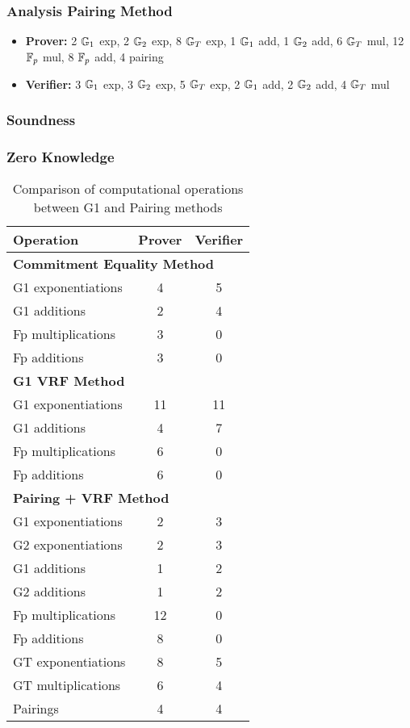 \newpage
\subsubsection{Analysis Pairing Method}
\begin{itemize}
    \item \textbf{Prover:} 2 $\mathbb{G}_1$ exp, 2 $\mathbb{G}_2$ exp, 8 $\mathbb{G}_T$ exp, 1 $\mathbb{G}_1$ add, 1 $\mathbb{G}_2$ add, 6 $\mathbb{G}_T$ mul, 12 $\mathbb{F}_p$ mul, 8 $\mathbb{F}_p$ add, 4 pairing
    
    \item \textbf{Verifier:} 3 $\mathbb{G}_1$ exp, 3 $\mathbb{G}_2$ exp, 5 $\mathbb{G}_T$ exp, 2 $\mathbb{G}_1$ add, 2 $\mathbb{G}_2$ add, 4 $\mathbb{G}_T$ mul
\end{itemize}

\subsubsection{Soundness}

\subsubsection{Zero Knowledge}



\begin{table}[h]
\centering
\begin{tabular}{|l|c|c|}
\hline
\textbf{Operation} & \textbf{Prover} & \textbf{Verifier} \\
\hline
\multicolumn{3}{|l|}{\textbf{Commitment Equality Method}} \\
\hline
G1 exponentiations & 4 & 5 \\
G1 additions & 2 & 4 \\
Fp multiplications & 3 & 0 \\
Fp additions & 3 & 0 \\
\hline
\multicolumn{3}{|l|}{\textbf{G1 VRF Method}} \\
\hline
G1 exponentiations & 11 & 11 \\
G1 additions & 4 & 7 \\
Fp multiplications & 6 & 0 \\
Fp additions & 6 & 0 \\
\hline
\multicolumn{3}{|l|}{\textbf{Pairing + VRF Method}} \\
\hline
G1 exponentiations & 2 & 3 \\
G2 exponentiations & 2 & 3 \\
G1 additions & 1 & 2 \\
G2 additions & 1 & 2 \\
Fp multiplications & 12 & 0 \\
Fp additions & 8 & 0 \\
GT exponentiations & 8 & 5 \\
GT multiplications & 6 & 4 \\
Pairings & 4 & 4 \\
\hline
\end{tabular}
\caption{Comparison of computational operations between G1 and Pairing methods}
\end{table}

